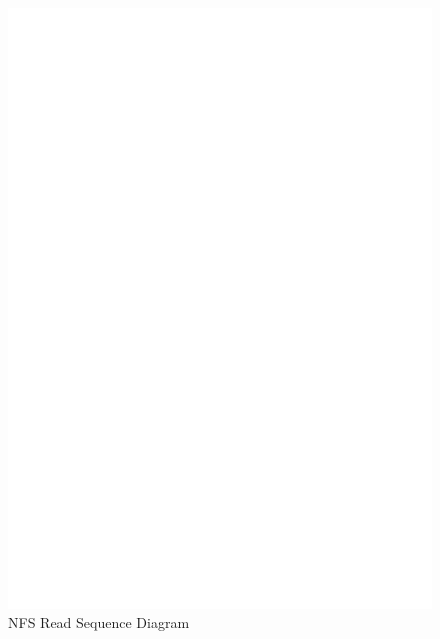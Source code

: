 \begin{figure}
\centering
\includegraphics[scale=0.9]{figures/ReadSequence.eps}
\caption{NFS Read Sequence Diagram}
\label{fig:NFSRead}
\end{figure}

